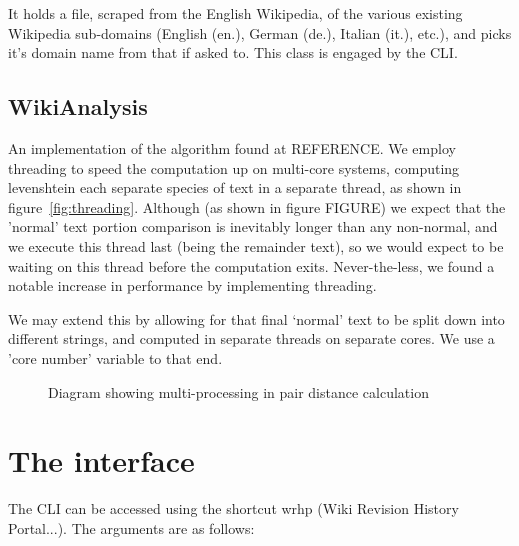 It holds a file, scraped from the English Wikipedia, of the various
existing Wikipedia sub-domains (English (en.), German (de.), Italian
(it.), etc.), and picks it's domain name from that if asked to. This
class is engaged by the CLI.

\subsection*{WikiAnalysis}
An implementation of the algorithm found at REFERENCE. We employ
threading to speed the computation up on multi-core systems, computing
levenshtein each separate species of text in a separate thread, as
shown in figure~\ref{fig:threading}. Although (as shown in figure
FIGURE) we expect that the 'normal' text portion comparison is
inevitably longer than any non-normal, and we execute this thread last
(being the remainder text), so we would expect to be waiting on this
thread before the computation exits. Never-the-less, we found a
notable increase in performance by implementing threading.

We may extend this by allowing for that final `normal' text to be
split down into different strings, and computed in separate threads on
separate cores. We use a 'core number' variable to that end.

\begin{figure}
  \centering
  \caption{Diagram showing multi-processing in pair distance calculation}
\end{figure}

\section{The interface}
The CLI can be accessed using the shortcut wrhp (Wiki Revision History
Portal...). The arguments are as follows:

